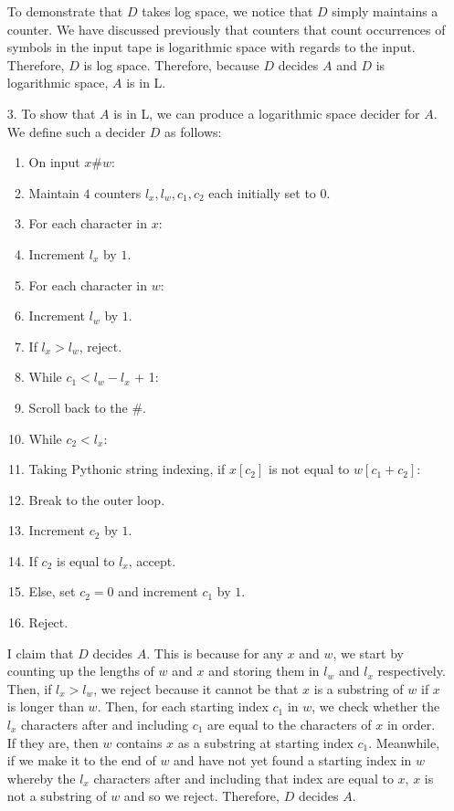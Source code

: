 \documentclass[11pt, reqno]{amsart}
\theoremstyle{plain}
\theoremstyle{definition}
\newcounter{r}
\def\tab{\hspace{10pt}}
\begin{document}
\begin{enumerate}
    To demonstrate that $D$ takes log space, we notice that $D$ simply
    maintains a counter. We have discussed previously that counters that count
    occurrences of symbols in the input tape is logarithmic space with regards
    to the input. Therefore, $D$ is log space. Therefore, because $D$ decides
    $A$ and $D$ is logarithmic space, $A$ is in L.
  \item[3.] To show that $A$ is in L, we can produce a logarithmic space
    decider for $A$. We define such a decider $D$ as follows:
    \begin{enumerate}[1.]
      \item On input $x\#w$:
      \item\tab Maintain $4$ counters $l_x,l_w,c_1, c_2$ each initially set to
        $0$.
      \item\tab For each character in $x$:
      \item\tab\tab Increment $l_x$ by $1$.
      \item\tab For each character in $w$:
      \item\tab\tab Increment $l_w$ by $1$.
      \item\tab If $l_x > l_w$, reject.
      \item\tab While $c_1 < l_w - l_x$ + 1:
      \item\tab\tab Scroll back to the $\#$.
      \item\tab\tab While $c_2 < l_x$:
      \item\tab\tab\tab Taking Pythonic string indexing, if $x[c_2]$ is not
        equal to $w[c_1+c_2]$:
      \item\tab\tab\tab\tab Break to the outer loop.
      \item\tab\tab\tab Increment $c_2$ by $1$.
      \item\tab\tab If $c_2$ is equal to $l_x$, accept.
      \item\tab\tab Else, set $c_2 = 0$ and increment $c_1$ by $1$.
      \item\tab Reject.
    \end{enumerate}
    I claim that $D$ decides $A$. This is because for any $x$ and $w$, we start
    by counting up the lengths of $w$ and $x$ and storing them in $l_w$ and
    $l_x$ respectively. Then, if $l_x > l_w$, we reject because it cannot be
    that $x$ is a substring of $w$ if $x$ is longer than $w$. Then, for each
    starting index $c_1$ in $w$, we check whether the $l_x$ characters after
    and including $c_1$ are equal to the characters of $x$ in order. If they
    are, then $w$ contains $x$ as a substring at starting index $c_1$.
    Meanwhile, if we make it to the end of $w$ and have not yet found a
    starting index in $w$ whereby the $l_x$ characters after and including that
    index are equal to $x$, $x$ is not a substring of $w$ and so we reject.
    Therefore, $D$ decides $A$.


\end{enumerate}
\end{document}

